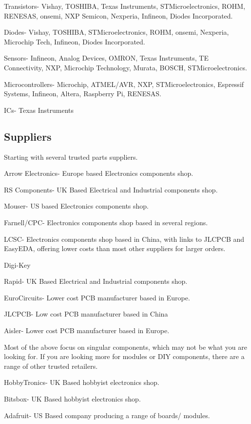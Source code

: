 \documentclass[a4paper,11pt]{report}
\begin{document}
Transistors- Vishay, TOSHIBA, Texas Instruments, STMicroelectronics, ROHM, RENESAS, onsemi, NXP Semicon, Nexperia, Infineon, Diodes Incorporated.

Diodes- Vishay, TOSHIBA, STMicroelectronics, ROHM, onsemi, Nexperia, Microchip Tech, Infineon, Diodes Incorporated.

Sensors- Infineon, Analog Devices, OMRON, Texas Instruments, TE Connectivity, NXP, Microchip Technology, Murata, BOSCH, STMicroelectronics.

Microcontrollers- Microchip, ATMEL/AVR, NXP, STMicroelectronics, Espressif Systems, Infineon, Altera, Raspberry Pi, RENESAS.

ICs- Texas Instruments

\subsection{Suppliers}

Starting with several trusted parts suppliers.

Arrow Electronics- Europe based Electronics components shop.

RS Components- UK Based Electrical and Industrial components shop.

Mouser- US based Electronics components shop.

Farnell/CPC- Electronics components shop based in several regions.

LCSC- Electronics components shop based in China, with links to JLCPCB and EasyEDA, offering lower costs than most other suppliers for larger orders.

Digi-Key

Rapid- UK Based Electrical and Industrial components shop.

EuroCircuits- Lower cost PCB manufacturer based in Europe.

JLCPCB- Low cost PCB manufacturer based in China

Aisler- Lower cost PCB manufacturer based in Europe.


Most of the above focus on singular components, which may not be what you are looking for. If you are looking more for modules or DIY components, there are a range of other trusted retailers.

HobbyTronics- UK Based hobbyist electronics shop.

Bitsbox- UK Based hobbyist electronics shop.

Adafruit- US Based company producing a range of boards/ modules.
\end{document}
